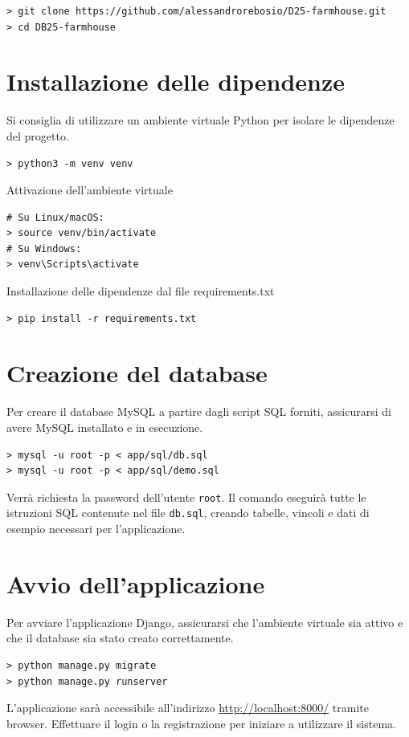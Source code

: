 \documentclass[a4paper,12pt]{report}
\begin{document}
\begin{verbatim}
> git clone https://github.com/alessandrorebosio/D25-farmhouse.git
> cd DB25-farmhouse
\end{verbatim}

\section{Installazione delle dipendenze}

Si consiglia di utilizzare un ambiente virtuale Python per isolare le dipendenze del progetto.

\begin{verbatim}
> python3 -m venv venv
\end{verbatim}

\noindent Attivazione dell'ambiente virtuale
\begin{verbatim}
# Su Linux/macOS:
> source venv/bin/activate
# Su Windows:
> venv\Scripts\activate
\end{verbatim}

\noindent Installazione delle dipendenze dal file requirements.txt
\begin{verbatim}
> pip install -r requirements.txt
\end{verbatim}

\section{Creazione del database}

Per creare il database MySQL a partire dagli script SQL forniti, assicurarsi di avere MySQL
installato e in esecuzione.

\begin{verbatim}
> mysql -u root -p < app/sql/db.sql
> mysql -u root -p < app/sql/demo.sql
\end{verbatim}

Verrà richiesta la password dell'utente \texttt{root}. Il comando eseguirà tutte le
istruzioni SQL contenute nel file \texttt{db.sql}, creando tabelle, vincoli e dati di
esempio necessari per l'applicazione.

\section{Avvio dell'applicazione}

Per avviare l'applicazione Django, assicurarsi che l'ambiente virtuale sia attivo e che il database
sia stato creato correttamente.

\begin{verbatim}
> python manage.py migrate
> python manage.py runserver
\end{verbatim}

L'applicazione sarà accessibile all'indirizzo \url{http://localhost:8000/} tramite browser. Effettuare
il login o la registrazione per iniziare a utilizzare il sistema.
\end{document}
